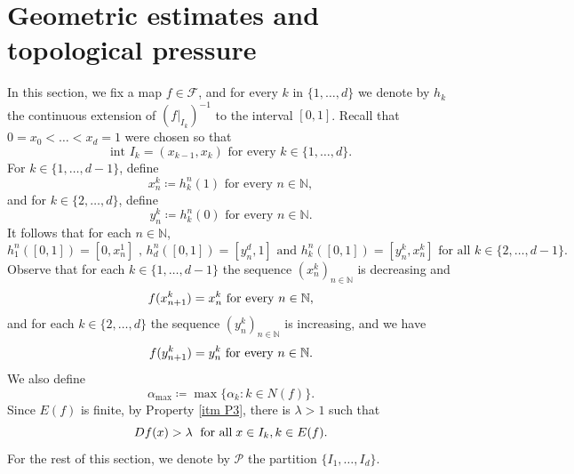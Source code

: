 \documentclass[10pt,a4paper]{amsart}
\numberwithin{equation}{section} %
\numberwithin{figure}{section} %
\newcommand{\N}{\mathbb{N}}
\newcommand{\sF}{\mathscr{F}}
\renewcommand{\=}{\coloneqq}
\begin{document}
\section{Geometric estimates and topological pressure}\label{sec: geometric estimates and top pressure}
In this section, we fix a map $f\in\sF$, and for every $k$ in $\{1,\ldots,d\}$ we denote by $h_k$ the continuous extension of $(f|_{I_k})^{-1}$ to the interval $[0,1]$. Recall that $0=x_0<\dots<x_d=1$ were chosen so that
\begin{equation}
    \text{int }I_k=(x_{k-1},x_{k}) \text{ for every } k\in\{1,\ldots,d\}.
\end{equation}
For $k\in \{1,\ldots,d-1\}$, define
\begin{equation}\label{e: defi x_n^k}
    x_n^k\= h_k^n(1) \text{ for every }n\in \N,
\end{equation}
and for $k\in\{2,\ldots,d\}$, define
\begin{equation}\label{e: defi y_n^k}
    y_n^k \= h_k^n (0) \text{ for every }n\in\N.
\end{equation}
It follows that for each $n\in\N$,
\begin{equation*}
    h_1^n([0,1]) = [0,x_{n}^1]\text{ , }h_d^n([0,1]) = [y_{n}^d,1] \text{ and } h_k^n([0,1]) = [y_{n}^k , x_n^k] \text{ for all } k\in\{2,\ldots,d-1\}.
\end{equation*}
Observe that for each $k\in\{1,\ldots,d-1\}$ the sequence $(x_{n}^k)_{n\in\N}$ is decreasing and 
\begin{equation}\label{e: f(x_{n+1}) = x_{n}}
f(x_{n+1}^k)= x_n^k \text{ for every }n\in\N,
\end{equation}
and for each  $k\in\{2,\ldots,d\}$ the sequence $ (y_{n}^k)_{n\in \N}$ is increasing, and we have
\begin{equation}\label{e: f(y_{n+1})= y_{n}}
f(y_{n+1}^k)= y_n^k \text{ for every } n\in\N.
\end{equation}
We also define 
\begin{equation}
\alpha_{\max}\= \max\{\alpha_k: k\in N(f)\}.
\end{equation}
Since $E(f)$ is finite, by Property \ref{itm P3}, there is $\lambda>1$ such that
\begin{equation}\label{eq exp bound}
    Df(x) >\lambda \text{ \;for all\;}x\in I_k, k\in E(f).
\end{equation}
For the rest of this section, we denote by $\mathcal{P}$ the partition $\{I_1,\ldots,I_d\}$.
\end{document}
